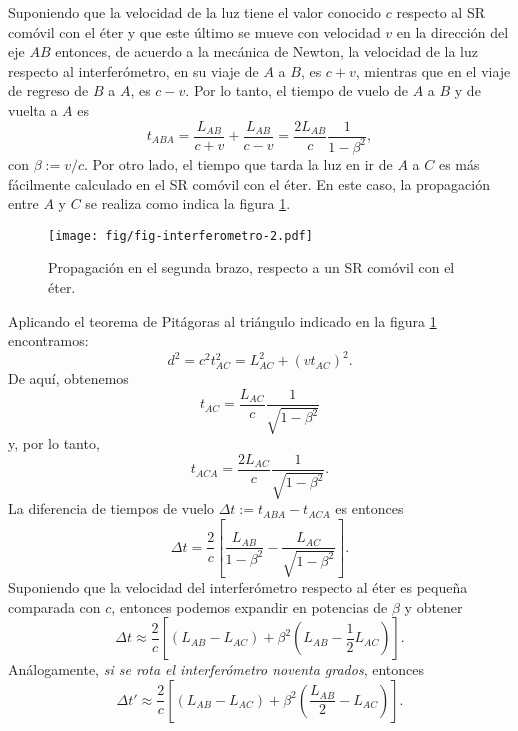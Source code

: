 Suponiendo que la velocidad de la luz tiene el valor conocido $c$ respecto al SR comóvil con el éter y que este último se mueve con velocidad $v$ en la dirección del eje $AB$ entonces, de acuerdo a la mecánica de Newton, la velocidad de la luz respecto al interferómetro, en su viaje de $A$ a $B$, es $c+v$, mientras que en el viaje de regreso de $B$ a $A$, es $c-v$. Por lo tanto, el tiempo de vuelo de $A$ a $B$ y de vuelta a $A$ es
\begin{equation} \label{eq:michelson1}
t_{ABA}=\frac{L_{AB}}{c+v}+\frac{L_{AB}}{c-v}=\frac{2L_{AB}}{c}\frac{1}{1-\beta^2},
\end{equation}
con $\beta:=v/c$. Por otro lado, el tiempo que tarda la luz en ir de $A$ a $C$ es más fácilmente calculado en el SR comóvil con el éter. En este caso, la propagación entre $A$ y $C$ se realiza como indica la figura \ref{fig:michelson2}.
\begin{figure}[H]
\begin{center}
\texttt{[image: fig/fig-interferometro-2.pdf]}
\end{center}
\caption{Propagación en el segunda brazo, respecto a un SR comóvil con el éter.} \label{fig:michelson2}
\end{figure}
Aplicando el teorema de Pitágoras al triángulo indicado en la figura \ref{fig:michelson2} encontramos:
\begin{equation}\label{eq:michelson2}
 d^2=c^2t_{AC}^2=L_{AC}^2+(vt_{AC})^2.
\end{equation}
De aquí, obtenemos
\begin{equation}
 t_{AC}=\frac{L_{AC}}{c}\frac{1}{\sqrt{1-\beta^2}}
\end{equation}
y, por lo tanto,
\begin{equation} \label{eq:michelson4}
t_{ACA}=\frac{2L_{AC}}{c}\frac{1}{\sqrt{1-\beta^2}}.
\end{equation}
La diferencia de tiempos de vuelo $\Delta t:=t_{ABA}-t_{ACA}$ es entonces
\begin{equation} \label{eq:michelson5}
\Delta t=\frac{2}{c}\left[\frac{L_{AB}}{1-\beta^2}-\frac{L_{AC}}{\sqrt{1-\beta^2}}\right].
\end{equation}
Suponiendo que la velocidad del interferómetro respecto al éter es peque\~na comparada con $c$, entonces podemos expandir en potencias de $\beta$ y obtener
\begin{equation} \label{eq:michelson6}
\Delta t\approx\frac{2}{c}\left[(L_{AB}-L_{AC})+\beta^2(L_{AB}-\frac{1}{2}L_{AC})\right].
\end{equation}
Análogamente, \textit{si se rota el interferómetro noventa grados}, entonces 
\begin{equation}
\Delta t'\approx\frac{2}{c}\left[(L_{AB}-L_{AC})+\beta^2(\frac{L_{AB}}{2}-L_{AC})\right].
\end{equation}

